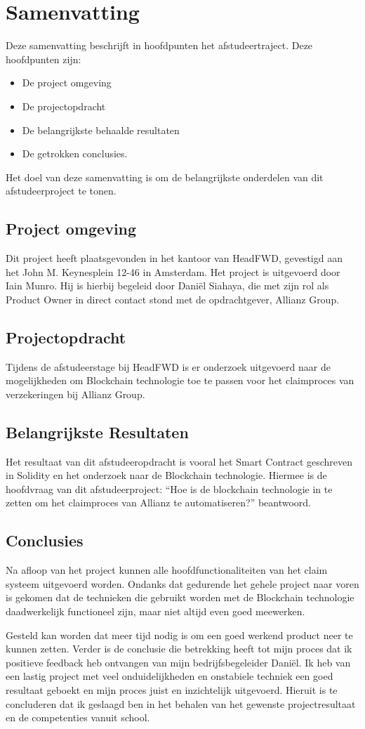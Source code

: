 \chapter{Samenvatting}
Deze samenvatting beschrijft in hoofdpunten het afstudeertraject. Deze hoofdpunten zijn:
\begin{itemize} 
	\item De project omgeving
	\item De projectopdracht
	\item De belangrijkste behaalde resultaten
	\item De getrokken conclusies.
\end{itemize}
Het doel van deze samenvatting is om de belangrijkste onderdelen van dit afstudeerproject te tonen.

\section{Project omgeving}
Dit project heeft plaatsgevonden in het kantoor van HeadFWD, gevestigd aan het John M. Keynesplein 12-46 in Amsterdam. Het project is uitgevoerd door Iain Munro. Hij is hierbij begeleid door Daniël Siahaya, die met zijn rol als Product Owner in direct contact stond met de opdrachtgever, Allianz Group.

\section{Projectopdracht}
Tijdens de afstudeerstage bij HeadFWD is er onderzoek uitgevoerd naar de mogelijkheden om Blockchain technologie toe te passen voor het claimproces van verzekeringen bij Allianz Group.

\section{Belangrijkste Resultaten}
Het resultaat van dit afstudeeropdracht is vooral het Smart Contract geschreven in Solidity en het onderzoek naar de Blockchain technologie. Hiermee is de hoofdvraag van dit afstudeerproject: “Hoe is de blockchain technologie in te zetten om het claimproces van Allianz te automatiseren?” beantwoord.

\section{Conclusies}
Na afloop van het project kunnen alle hoofdfunctionaliteiten van het claim systeem uitgevoerd worden. Ondanks dat gedurende het gehele project naar voren is gekomen dat de technieken die gebruikt worden met de Blockchain technologie daadwerkelijk functioneel zijn, maar niet altijd even goed meewerken.\par

Gesteld kan worden dat meer tijd nodig is om een goed werkend product neer te kunnen zetten. Verder is de conclusie die betrekking heeft tot mijn proces dat ik positieve feedback heb ontvangen van mijn bedrijfsbegeleider Daniël. Ik heb van een lastig project met veel onduidelijkheden en onstabiele techniek een goed resultaat geboekt en mijn proces juist en inzichtelijk uitgevoerd. Hieruit is te concluderen dat ik geslaagd ben in het behalen van het gewenste projectresultaat en de competenties vanuit school.
